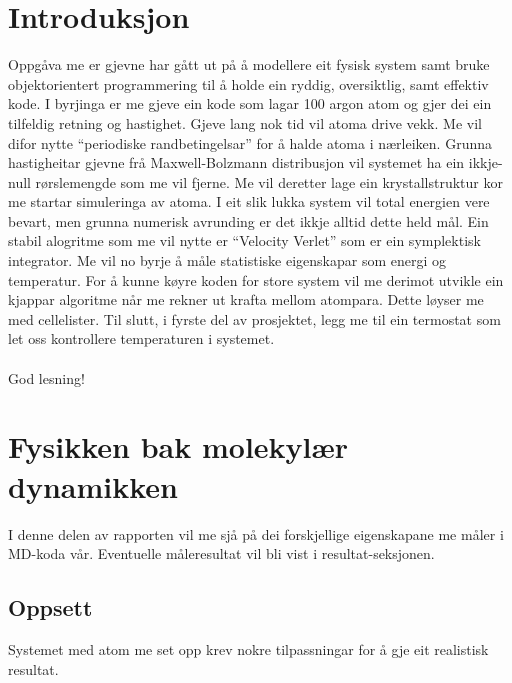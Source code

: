 \documentclass[12pt, a4paper]{article}
\theoremstyle{definition} \newtheorem*{definition}{Teorem}
\begin{document}
\newpage
    \tableofcontents
\newpage

\section*{Introduksjon}
    Oppgåva me er gjevne har gått ut på å modellere eit fysisk system samt bruke objektorientert programmering til å holde ein ryddig, oversiktlig, samt effektiv kode. 
    I byrjinga er me gjeve ein kode som lagar 100 argon atom og gjer dei ein tilfeldig retning og hastighet. Gjeve lang nok tid vil atoma drive vekk. Me vil difor nytte
    ``periodiske randbetingelsar'' for å halde atoma i nærleiken. Grunna hastigheitar gjevne frå Maxwell-Bolzmann distribusjon vil systemet ha ein ikkje-null
    rørslemengde som me vil fjerne. Me vil deretter lage ein krystallstruktur kor me startar simuleringa av atoma. I eit slik lukka system vil total energien vere bevart, 
    men grunna numerisk avrunding er det ikkje alltid dette held mål. Ein stabil alogritme som me vil nytte er ``Velocity Verlet'' som er ein symplektisk integrator. %
    Me vil no byrje å måle statistiske eigenskapar som energi og temperatur. For å kunne køyre koden for store system vil me derimot utvikle ein kjappar algoritme når 
    me rekner ut krafta mellom atompara. Dette løyser me med cellelister. Til slutt, i fyrste del av prosjektet, legg me til ein termostat som let oss kontrollere 
    temperaturen i systemet. \\ \\
    God lesning!



\newpage


\section*{Fysikken bak molekylær dynamikken}
    I denne delen av rapporten vil me sjå på dei forskjellige eigenskapane me måler i MD-koda vår. Eventuelle måleresultat vil bli vist i resultat-seksjonen.

    \subsection*{Oppsett}
        Systemet med atom me set opp krev nokre tilpassningar for å gje eit realistisk resultat. 
\end{document}
